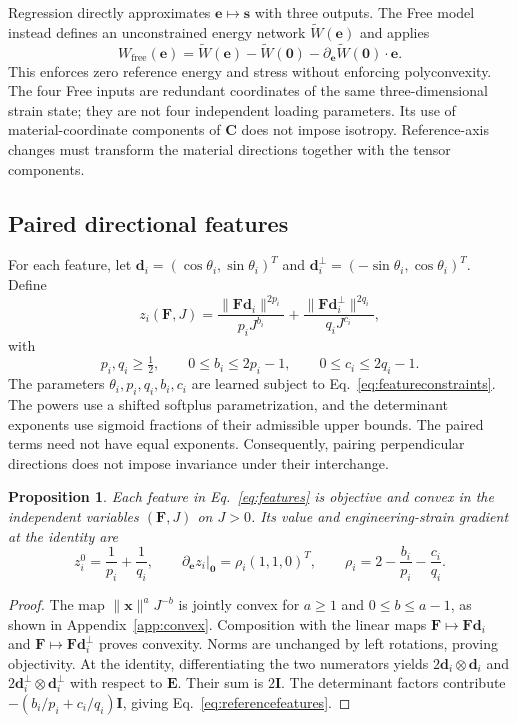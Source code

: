 \documentclass[10pt,a4paper]{article}
\newcommand{\F}{\bm F}
\newcommand{\C}{\bm C}
\newcommand{\E}{\bm E}
\newcommand{\I}{\bm I}
\newcommand{\ee}{\bm e}
\newcommand{\ssv}{\bm s}
\newtheorem{proposition}{Proposition}
\begin{document}
Regression directly approximates $\ee\mapsto\ssv$ with three outputs. The Free model instead defines an unconstrained energy network $\widetilde W(\ee)$ and applies
\begin{equation}
 W_{\mathrm{free}}(\ee)=\widetilde W(\ee)-\widetilde W(\bm0)
 -\partial_{\ee}\widetilde W(\bm0)\cdot\ee.
 \label{eq:free}
\end{equation}
This enforces zero reference energy and stress without enforcing polyconvexity. The four Free inputs are redundant coordinates of the same three-dimensional strain state; they are not four independent loading parameters. Its use of material-coordinate components of $\C$ does not impose isotropy. Reference-axis changes must transform the material directions together with the tensor components.

\subsection{Paired directional features}
For each feature, let $\bm d_i=(\cos\theta_i,\sin\theta_i)^T$ and $\bm d_i^\perp=(-\sin\theta_i,\cos\theta_i)^T$. Define
\begin{equation}
 z_i(\F,J)=\frac{\|\F\bm d_i\|^{2p_i}}{p_i J^{b_i}}
          +\frac{\|\F\bm d_i^\perp\|^{2q_i}}{q_i J^{c_i}},
 \label{eq:features}
\end{equation}
with
\begin{equation}
 p_i,q_i\geq\tfrac12,\qquad
 0\leq b_i\leq2p_i-1,\qquad 0\leq c_i\leq2q_i-1.
 \label{eq:featureconstraints}
\end{equation}
The parameters $\theta_i,p_i,q_i,b_i,c_i$ are learned subject to Eq.~\eqref{eq:featureconstraints}. The powers use a shifted softplus parametrization, and the determinant exponents use sigmoid fractions of their admissible upper bounds. The paired terms need not have equal exponents. Consequently, pairing perpendicular directions does not impose invariance under their interchange.

\begin{proposition}
Each feature in Eq.~\eqref{eq:features} is objective and convex in the independent variables $(\F,J)$ on $J>0$. Its value and engineering-strain gradient at the identity are
\begin{equation}
 z_i^0=\frac1{p_i}+\frac1{q_i},\qquad
 \partial_{\ee}z_i\big|_{\bm0}=\rho_i(1,1,0)^T,
 \qquad \rho_i=2-\frac{b_i}{p_i}-\frac{c_i}{q_i}.
 \label{eq:referencefeatures}
\end{equation}
\end{proposition}
\begin{proof}
The map $\|\bm x\|^a J^{-b}$ is jointly convex for $a\geq1$ and $0\leq b\leq a-1$, as shown in Appendix~\ref{app:convex}. Composition with the linear maps $\F\mapsto\F\bm d_i$ and $\F\mapsto\F\bm d_i^\perp$ proves convexity. Norms are unchanged by left rotations, proving objectivity. At the identity, differentiating the two numerators yields $2\bm d_i\otimes\bm d_i$ and $2\bm d_i^\perp\otimes\bm d_i^\perp$ with respect to $\E$. Their sum is $2\I$. The determinant factors contribute $-(b_i/p_i+c_i/q_i)\I$, giving Eq.~\eqref{eq:referencefeatures}.
\end{proof}
\end{document}
